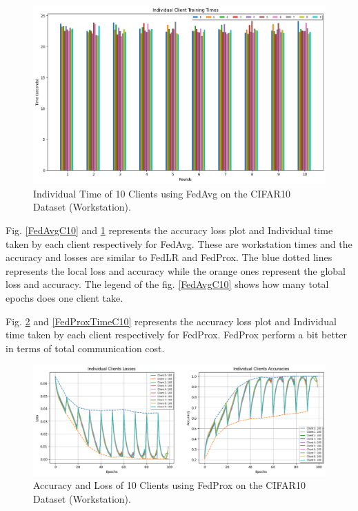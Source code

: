 \documentclass[conference]{IEEEtran}
\begin{document}
\begin{figure}[htp!]
	\centering
	\includegraphics[scale=.3]{Images/Result Images/CIFAR 10/cifar10_fedavg_total_time_635o65 }
	\caption{Individual Time of 10 Clients using FedAvg on the CIFAR10 Dataset (Workstation).}
	\label{FedAvgTimeC10}
\end{figure}

Fig. \ref{FedAvgC10} and \ref{FedAvgTimeC10} represents the accuracy loss plot and Individual time taken by each client respectively for FedAvg.  These are workstation times and the accuracy and losses are similar to FedLR and FedProx. The blue dotted lines represents the local loss and accuracy while the orange ones represent the global loss and accuracy. The legend of the fig. \ref{FedAvgC10} shows how many total epochs does one client take.

Fig. \ref{FedProxC10} and \ref{FedProxTimeC10}  represents the accuracy loss plot and Individual time taken by each client respectively for FedProx. FedProx perform a bit better in terms of total communication cost.
\begin{figure}[htp!]
	\centering
	\includegraphics[scale=.28]{Images/Result Images/CIFAR 10/cifar10_fedPROX_lossacc }
	\caption{Accuracy and Loss of 10 Clients using FedProx on the CIFAR10 Dataset (Workstation).}
	\label{FedProxC10}
\end{figure}
\end{document}
